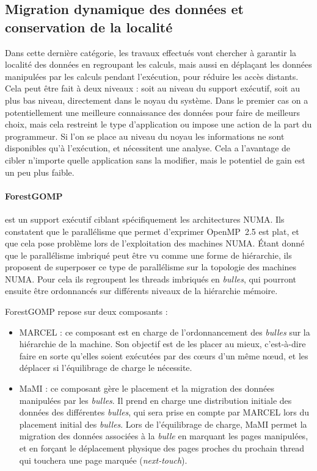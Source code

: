 \subsection{Migration dynamique des données et conservation de la localité}\label{sec:rw:numa:thread-data}

Dans cette dernière catégorie, les travaux effectués vont chercher à garantir la localité des données en regroupant les calculs, mais aussi en déplaçant les données manipulées par les calculs pendant l'exécution, pour réduire les accès distants.
Cela peut être fait à deux niveaux : soit au niveau du support exécutif, soit au plus bas niveau, directement dans le noyau du système.
Dans le premier cas on a potentiellement une meilleure connaissance des données pour faire de meilleurs choix, mais cela restreint le type d'application ou impose une action de la part du programmeur.
Si l'on se place au niveau du noyau les informations ne sont disponibles qu'à l'exécution, et nécessitent une analyse. Cela a l'avantage de cibler n'importe quelle application sans la modifier, mais le potentiel de gain est un peu plus faible.

\paragraph{ForestGOMP~\cite{Broquedis2010a}} est un support exécutif ciblant spécifiquement les architectures NUMA.
Ils constatent que le parallélisme que permet d'exprimer OpenMP~2.5 est plat, et que cela pose problème lors de l'exploitation des machines NUMA.
Étant donné que le parallélisme imbriqué peut être vu comme une forme de hiérarchie, ils proposent de superposer ce type de parallélisme sur la topologie des machines NUMA.
Pour cela ils regroupent les threads imbriqués en \emph{bulles}, qui pourront ensuite être ordonnancés sur différents niveaux de la hiérarchie mémoire.


ForestGOMP repose sur deux composants :
\begin{itemize}
  \item MARCEL : ce composant est en charge de l'ordonnancement des \emph{bulles} sur la hiérarchie de la machine. Son objectif est de les placer au mieux, c'est-à-dire faire en sorte qu'elles soient exécutées par des cœurs d'un même nœud, et les déplacer si l'équilibrage de charge le nécessite.
  \item MaMI : ce composant gère le placement et la migration des données manipulées par les \emph{bulles}.
Il prend en charge une distribution initiale des données des différentes \emph{bulles}, qui sera prise en compte par MARCEL lors du placement initial des \emph{bulles}.
Lors de l'équilibrage de charge, MaMI permet la migration des données associées à la \emph{bulle} en marquant les pages manipulées, et en forçant le déplacement physique des pages proches du prochain thread qui touchera une page marquée (\emph{next-touch}).
\end{itemize}

